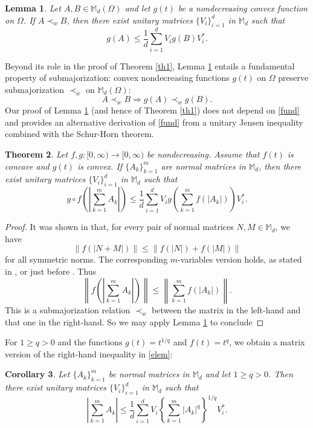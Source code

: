 \documentclass[12pt,reqno]{article}
\newtheorem{theorem}{Theorem}[section]
\newtheorem{lemma}[theorem]{Lemma}
\newtheorem{cor}[theorem]{Corollary}
\theoremstyle{definition}
\theoremstyle{remark}
\numberwithin{equation}{section}
\def\bM{\mathbb{M}}
\begin{document}
\vskip 5pt
\begin{lemma}\label{L1} Let $A,B\in\bM_d(\Omega)$ and let $g(t)$ be a nondecreasing convex function on $\Omega$. If $A\prec_w B$, then 
there exist unitary matrices $\{V_i\}_{i=1}^d$  in $\bM_d$ such that 
$$
g(A)\le \frac{1}{d}\sum_{i=1}^d V_i g(B)V_i^*.
$$
\end{lemma}

\vskip 5pt
Beyond its role in the proof of Theorem \ref{th1}, Lemma \ref{L1} entails a fundamental property of submajorization: convex nondecreasing functions $g(t)$ on $\Omega$ preserve submajorization $\prec_w$ on $\bM_d(\Omega)$:
\begin{equation}\label{fund}
A\prec_w  B \Rightarrow g(A) \prec_w g(B).
\end{equation}
Our proof of Lemma \ref{L1} (and hence of Theorem \ref{th1}) does not depend on \eqref{fund}  and provides an alternative derivation of \eqref{fund} from a unitary Jensen inequality combined with the Schur-Horn theorem.

\vskip 5pt
\begin{theorem}\label{th2} Let $f,g:[0,\infty)\to[0,\infty)$ be nondecreasing. Assume that $f(t)$ is concave and  $g(t)$ is convex. If $\{A_k\}_{k=1}^m$ are  normal matrices in $\bM_d$, then there exist unitary matrices $\{V_i\}_{i=1}^d$  in $\bM_d$ such that 
$$ 
g\circ f\left(\left|\sum_{k=1}^m A_k\right|\right) \le \frac{1}{d} \sum_{i=1}^d V_i g\left(\sum_{k=1}^m f(|A_k|)\right)V_i^*.
$$
\end{theorem}


\vskip 5pt
\begin{proof} It was shown in \cite{Bpams} that, for every pair of normal matrices $N,M\in\bM_d$, we have 
$$
\| f(|N+M|)\| \le \| f(|N|) + f(|M|) \|
$$
for all symmetric norms.  The corresponding $m$-variables version  holds,
  as stated in \cite[Theorem 3.3]{Bpams}, or just before \cite[Corollary 2.4]{Bpams}. Thus
$$
\left\|  f\left(\left|\sum_{k=1}^m A_k\right|\right)  \right\| \le \left\| \sum_{k=1}^m f(|A_k|)\right\|.
$$
This is a submajorization relation $\prec_w$ between the matrix in the left-hand and that one in the right-hand. So we may apply Lemma \ref{L1}
to conclude
\end{proof}



\vskip 5pt
For $1\ge q>0$ and  the functions $g(t)=t^{1/q}$ and $f(t)=t^{q}$,  we  obtain a matrix version of the right-hand inequality in \eqref{elem}:

\vskip 5pt
\begin{cor}\label{corq} Let $\{A_k\}_{k=1}^m$ be normal matrices in $\bM_d$ and let $1\ge q>0$. Then there exist unitary matrices $\{V_i\}_{i=1}^d$  in $\bM_d$ such that 
$$
\left|\sum_{k=1}^m A_k \right| \le \frac{1}{d} \sum_{i=1}^d V_i\left\{\sum_{k=1}^m |A_k|^q\right\}^{1/q}\!\!\!\!V_i^*.
$$
\end{cor}
\end{document}
